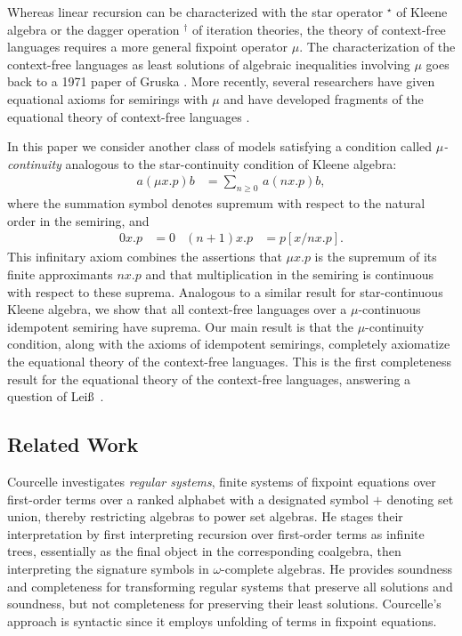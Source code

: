 \documentclass[copyright,creativecommons]{eptcs}
\theoremstyle{remark}
\newcommand\subst[2]{[#1/#2]}
\begin{document}
Whereas linear recursion can be characterized with the star operator $^\star$ of Kleene algebra or the dagger operation $^\dagger$ of iteration theories, the theory of context-free languages requires a more general fixpoint operator $\mu$. The characterization of the context-free languages as least solutions of algebraic inequalities involving $\mu$ goes back to a 1971 paper of Gruska \cite{Gruska71}. More recently, several researchers have given equational axioms for semirings with $\mu$ and have developed fragments of the equational theory of context-free languages \cite{cou86,esle2002,EsikLeiss05,Hopkins08a,Hopkins08b,leiss92b}.

In this paper we consider another class of models satisfying a condition called \emph{$\mu$-continuity} analogous to the star-continuity condition of Kleene algebra:
\begin{align*}
a(\mu x.p)b &= \sum_{n\geq 0}\,a(nx.p)b,
\end{align*}
where the summation symbol denotes supremum with respect to the natural order in the semiring, and
\begin{align*}
0x.p &= 0 & (n{+}1)x.p &= p\subst x{nx.p}.
\end{align*}
This infinitary axiom combines the assertions that $\mu x.p$ is the supremum of its finite approximants $nx.p$ and that multiplication in the semiring is continuous with respect to these suprema. Analogous to a similar result for star-continuous Kleene algebra, we show that all context-free languages over a $\mu$-continuous idempotent semiring have suprema. Our main result is that the $\mu$-continuity condition, along with the axioms of idempotent semirings, completely axiomatize the equational theory of the context-free languages. This is the first completeness result for the equational theory of the context-free languages, answering a question of Lei\ss\ \cite{leiss92b}.

\subsection{Related Work}
 
Courcelle \cite{cou86} investigates \emph{regular systems}, finite systems of fixpoint equations over first-order terms over a ranked alphabet with a designated symbol $+$ denoting set union, thereby restricting algebras to power set algebras.  He stages their interpretation by first interpreting recursion over first-order terms as infinite trees, essentially as the final object in the corresponding coalgebra, then interpreting the signature symbols in $\omega$-complete algebras.  He provides soundness and completeness for transforming regular systems that preserve all solutions and soundness, but not completeness for preserving their least solutions.  Courcelle's approach is syntactic since it employs unfolding of terms in fixpoint equations.
\end{document}
